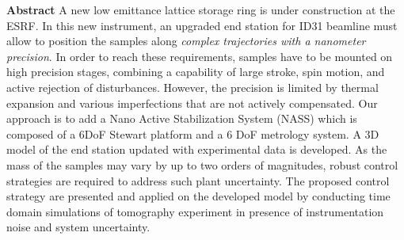 \textbf{Abstract}
A new low emittance lattice storage ring is under construction at the ESRF.
In this new instrument, an upgraded end station for ID31 beamline must allow to position the samples along \emph{complex trajectories with a nanometer precision}.
In order to reach these requirements, samples have to be mounted on high precision stages, combining a capability of large stroke, spin motion, and active rejection of disturbances.
However, the precision is limited by thermal expansion and various imperfections
that are not actively compensated. Our approach is to add a Nano Active Stabilization System (NASS) which is composed of a 6DoF Stewart platform and a 6 DoF metrology system.
A 3D model of the end station updated with experimental data is developed.
As the mass of the samples may vary by up to two orders of magnitudes, robust control strategies are required to address such plant uncertainty.
The proposed control strategy are presented and applied on the developed model by conducting time domain simulations of tomography experiment in presence of instrumentation noise and system uncertainty.

